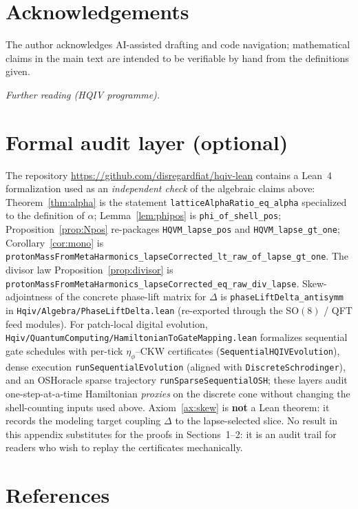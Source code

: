 \documentclass[11pt,a4paper]{article}
\newcommand{\repo}{\url{https://github.com/disregardfiat/hqiv-lean}}
\theoremstyle{plain}
\theoremstyle{definition}
\theoremstyle{remark}
\theoremstyle{plain}
\theoremstyle{definition}
\begin{document}
\section*{Acknowledgements}
The author acknowledges AI-assisted drafting and code navigation; mathematical claims in the main text are intended to be verifiable by hand from the definitions given.

\medskip
\noindent\textit{Further reading (HQIV programme).} \cite{ettinger2026hqiv,brodie2026}

\appendix

\section{Formal audit layer (optional)}

The repository \repo{} contains a Lean~4 formalization used as an \emph{independent check} of the algebraic claims above: Theorem~\ref{thm:alpha} is the statement \texttt{latticeAlphaRatio\_eq\_alpha} specialized to the definition of $\alpha$; Lemma~\ref{lem:phipos} is \texttt{phi\_of\_shell\_pos}; Proposition~\ref{prop:Npos} re-packages \texttt{HQVM\_lapse\_pos} and \texttt{HQVM\_lapse\_gt\_one}; Corollary~\ref{cor:mono} is \texttt{protonMassFromMetaHarmonics\_lapseCorrected\_lt\_raw\_of\_lapse\_gt\_one}.
The divisor law Proposition~\ref{prop:divisor} is \texttt{protonMassFromMetaHarmonics\_lapseCorrected\_eq\_raw\_div\_lapse}.
Skew-adjointness of the concrete phase-lift matrix for $\Delta$ is \texttt{phaseLiftDelta\_antisymm} in \texttt{Hqiv/Algebra/PhaseLiftDelta.lean} (re-exported through the SO$(8)$ / QFT feed modules).
For patch-local digital evolution, \texttt{Hqiv/QuantumComputing/HamiltonianToGateMapping.lean} formalizes sequential gate schedules with per-tick $\eta_\phi$--CKW certificates (\texttt{SequentialHQIVEvolution}), dense execution \texttt{runSequentialEvolution} (aligned with \texttt{DiscreteSchrodinger}), and an OSHoracle sparse trajectory \texttt{runSparseSequentialOSH}; these layers audit one-step-at-a-time Hamiltonian \emph{proxies} on the discrete cone without changing the shell-counting inputs used above.
Axiom~\ref{ax:skew} is \textbf{not} a Lean theorem: it records the modeling target coupling $\Delta$ to the lapse-selected slice.
No result in this appendix substitutes for the proofs in Sections~1--2: it is an audit trail for readers who wish to replay the certificates mechanically.

\section*{References}


\end{document}
